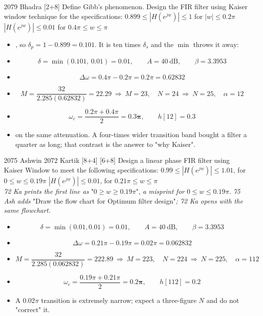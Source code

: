 \begin{asked}{2079 Bhadra \textperiodcentered{} [2+8]}
Define Gibb's phenomenon. Design the FIR filter using Kaiser window technique for the
specifications:\newline
$0.899\le|H(e^{jw})|\le1$ \quad for $|w|\le0.2\pi$\newline
$|H(e^{jw})|\le0.01$ \quad for $0.4\pi\le w\le\pi$
\end{asked}

\begin{itemize}
  \item {}, so
        $\delta_p=1-0.899=0.101$. It is ten times $\delta_s$ and the $\min$ throws it
        away:
  \item[] \[ \delta=\min(0.101,\ 0.01)=\mathbf{0.01},\qquad A=40\ \text{dB},\qquad
             \beta=3.3953 \]
  \item[] \[ \Delta\omega=0.4\pi-0.2\pi=0.2\pi=0.62832 \]
  \item[] \[ M=\frac{32}{2.285(0.62832)}=22.29\ \Rightarrow\ M=23,\quad
             N=24\ \Rightarrow\ \boxed{N=25},\quad \alpha=12 \]
  \item[] \[ \omega_c=\frac{0.2\pi+0.4\pi}{2}=\mathbf{0.3\pi},\qquad h[12]=0.3 \]
  \item {} on the same attenuation. A four-times wider
        transition band bought a filter a quarter as long; that contrast is the answer
        to "why Kaiser".
\end{itemize}

\begin{asked}{2075 Ashwin \textperiodcentered{} 2072 Kartik \textperiodcentered{} [8+4] [6+8]}
Design a linear phase FIR filter using Kaiser Window to meet the following
specifications:\newline
$0.99\le|H(e^{jw})|\le1.01$, \quad for $0\le w\le0.19\pi$\newline
$|H(e^{jw})|\le0.01$, \quad for $0.21\pi\le w\le\pi$\\
\textit{72 Ka prints the first line as} "$0\ge w\ge0.19\pi$", \textit{a misprint for}
$0\le w\le0.19\pi$. \textit{75 Ash adds} "Draw the flow chart for Optimum filter
design"\textit{; 72 Ka opens with the same flowchart.}
\end{asked}

\begin{itemize}
  \item[] \[ \delta=\min(0.01,0.01)=0.01,\qquad A=40\ \text{dB},\qquad \beta=3.3953 \]
  \item[] \[ \Delta\omega=0.21\pi-0.19\pi=0.02\pi=0.062832 \]
  \item[] \[ M=\frac{32}{2.285(0.062832)}=222.89\ \Rightarrow\ M=223,\quad
             N=224\ \Rightarrow\ \boxed{N=225},\quad \alpha=112 \]
  \item[] \[ \omega_c=\frac{0.19\pi+0.21\pi}{2}=\mathbf{0.2\pi},\qquad h[112]=0.2 \]
  \item {} A $0.02\pi$ transition
        is extremely narrow; expect a three-figure $N$ and do not "correct" it.
\end{itemize}

